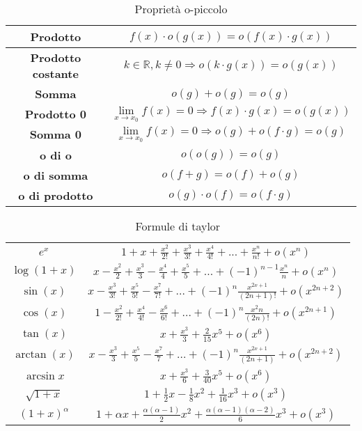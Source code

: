 \begin{table}[h!]
	\centering
	\setlength{\tabcolsep}{10pt}
	\renewcommand{\arraystretch}{2.5}
	\begin{tabular}{|c|c|}
		\hline
		\textbf{Prodotto} & $f(x) \cdot o(g(x)) = o(f(x) \cdot g(x))$\\
		\hline
		\textbf{Prodotto costante} & $k \in \mathbb{R}, k \neq 0 \Longrightarrow o(k \cdot g(x)) = o(g(x))$\\
		\hline
		\textbf{Somma} & $o(g) + o(g) = o(g)$ \\
		\hline
		\textbf{Prodotto 0} & $\lim\limits_{x\to x_0}f(x) = 0 \Longrightarrow f(x) \cdot g(x) = o(g(x))$ \\
		\hline
		\textbf{Somma 0} & $\lim\limits_{x\to x_0}f(x) = 0 \Longrightarrow o(g) + o(f \cdot g) = o(g)$ \\
		\hline
		\textbf{o di o} & $o(o(g)) = o(g)$ \\
		\hline
		\textbf{o di somma} & $o(f + g) = o(f) + o(g)$ \\
		\hline
		\textbf{o di prodotto} & $o(g) \cdot o(f) = o(f \cdot g)$ \\
		\hline
	\end{tabular}
	\caption{Proprietà o-piccolo}
\end{table}
\begin{table}[h!]
	\setlength{\tabcolsep}{5pt}
	\renewcommand{\arraystretch}{2.2}
	\centering
	\begin{tabular}{|c|c|}
		\hline
		$e^x$ & $1 + x + \frac{x^2}{2!} + \frac{x^3}{3!} + \frac{x^4}{4!} + ... + \frac{x^n}{n!} + o(x^n)$  \\
		$\log(1+x)$ & $x - \frac{x^2}{2} + \frac{x^3}{3} - \frac{x^4}{4} + \frac{x^5}{5} + ... + (-1)^{n-1}\frac{x^n}{n} + o(x^n)$ \\
		$\sin(x)$ & $x - \frac{x^3}{3!} + \frac{x^5}{5!} - \frac{x^7}{7!} + ... + (-1)^n \frac{x^{2x+1}}{(2n+1)!} + o(x^{2n+2})$ \\
		$\cos(x)$ & $1 - \frac{x^2}{2!} + \frac{x^4}{4!} - \frac{x^6}{6!} + ... + (-1)^n\frac{x^2n}{(2n)!} + o(x^{2n+1})$ \\
		$\tan(x)$ & $x + \frac{x^3}{3} + \frac{2}{15}x^5 + o(x^6)$\\
		$\arctan(x)$ & $x - \frac{x^3}{3} + \frac{x^5}{5} - \frac{x^7}{7} + ... + (-1)^n\frac{x^{2x+1}}{(2n + 1)} + o(x^{2n+2})$\\
		$\arcsin{x}$ & $x + \frac{x^3}{6} + \frac{3}{40}x^5 + o(x^6)$\\
		$\sqrt{1+x}$ & $1 + \frac{1}{2}x - \frac{1}{8}x^2 + \frac{1}{16}x^3 + o(x^3)$\\
		$(1+x)^{\alpha}$ & $1 + \alpha x + \frac{\alpha(\alpha - 1)}{2}x^2 + \frac{\alpha(\alpha - 1)(\alpha - 2)}{6}x^3 + o(x^3)$\\
		\hline
	\end{tabular}
	\caption{Formule di taylor}
\end{table}

